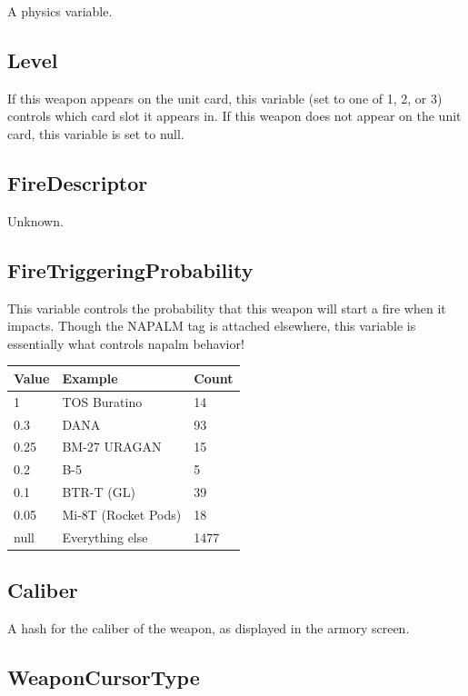 \documentclass{article}
\begin{document}
A physics variable.

\subsection{Level}

If this weapon appears on the unit card, this variable (set to one of 1, 2, or 3) controls which card slot it appears in. If this weapon does not appear on the unit card, this variable is set to null.

\subsection{FireDescriptor}

Unknown.

\subsection{FireTriggeringProbability}

This variable controls the probability that this weapon will start a fire when it impacts. Though the NAPALM tag is attached elsewhere, this variable is essentially what controls napalm behavior!

\begin{center}
    \begin{tabular}{ | l | l | l |}
    \hline
	Value & Example & Count\\
    \hline
	1 & TOS Buratino & 14\\
	0.3 & DANA & 93\\
	0.25 & BM-27 URAGAN & 15\\
	0.2 & B-5 & 5\\
	0.1 & BTR-T (GL) & 39\\
	0.05 & Mi-8T (Rocket Pods) & 18\\
	null & Everything else & 1477\\
    \hline
    \end{tabular}
\end{center}

\subsection{Caliber}

A hash for the caliber of the weapon, as displayed in the armory screen.

\subsection{WeaponCursorType}
\end{document}
